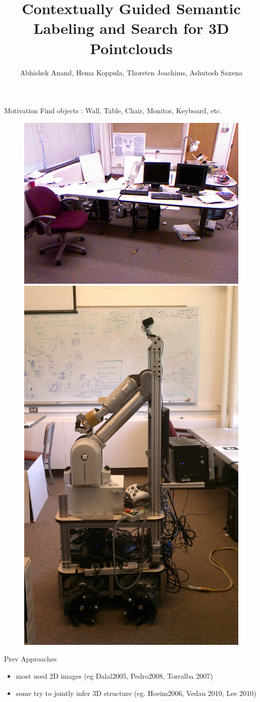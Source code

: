 \documentclass{beamer}
\title{Contextually Guided Semantic Labeling and Search for 3D Pointclouds}
\author{Abhishek Anand, Hema Koppula, Thorsten Joachims, Ashutosh Saxena}
\begin{document}
\begin{frame}
\titlepage
\end{frame}

\begin{frame}{Motivation}
Find objects : Wall, Table, Chair, Monitor, Keyboard, etc.
	\begin{figure}
		\includegraphics[width=0.65\linewidth]{scene2.png}
		\hskip0.1in
		\includegraphics[width=0.3\linewidth]{robot2.jpg}
	\end{figure}
\end{frame}

\begin{frame}{Prev Approaches}

	\begin{itemize}
		\item most used 2D images (eg Dalal2005, Pedro2008, Torralba 2007)
		\item some try to jointly infer 3D structure (eg. Hoeim2006, Vedau 2010, Lee 2010)
	\end{itemize}

\end{frame}
\end{document}
